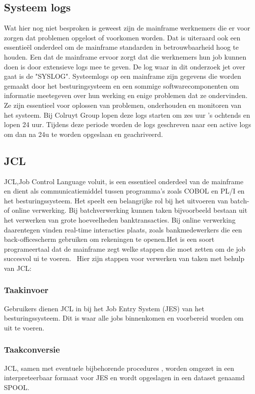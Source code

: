 \subsection{Systeem logs}
 Wat hier nog niet besproken is geweest zijn de mainframe werknemers die er voor zorgen dat problemen opgelost of voorkomen worden. Dat is uiteraard ook een essentieël onderdeel om de mainframe standarden in betrouwbaarheid hoog te houden. Een dat de mainframe ervoor zorgt dat die werknemers hun job kunnen doen is door extensieve logs mee te geven. De log waar in dit onderzoek jet over gaat is de "SYSLOG". Systeemlogs op een mainframe zijn gegevens die worden gemaakt door het besturingsysteem en een sommige softwarecomponenten om informatie meetegeven over hun werking en enige problemen dat ze ondervinden. Ze zijn essentieel voor oplossen van problemen, onderhouden en monitoren van het systeem. Bij Colruyt Group lopen deze logs starten om zes uur 's ochtends en lopen 24 uur. Tijdens deze periode worden de logs geschreven naar een active logs om dan na 24u te worden opgeslaan en geachriveerd.
 
\subsection{JCL}
JCL,Job Control Language voluit, is een essentieel onderdeel van de mainframe en dient als communicatiemiddel tussen programma's zoals COBOL en PL/I en het besturingssysteem. Het speelt een belangrijke rol bij het uitvoeren van batch- of online verwerking. Bij batchverwerking kunnen taken bijvoorbeeld bestaan uit het verwerken van grote hoeveelheden banktransacties. Bij online verwerking daarentegen vinden real-time interacties plaats, zoals bankmedewerkers die een back-officescherm gebruiken om rekeningen te openen.Het is een soort programeertaal dat de mainframe zegt welke stappen die moet zetten om de job succesvol ui te voeren.~\autocite{tutpoint} Hier zijn stappen voor verwerken van taken met behulp van JCL:

\subsubsection{Taakinvoer}
Gebruikers dienen JCL in bij het Job Entry System (JES) van het besturingssysteem. Dit is waar alle jobs binnenkomen en voorbereid worden om uit te voeren.

\subsubsection{Taakconversie}
JCL, samen met eventuele bijbehorende procedures , worden omgezet in een interpreteerbaar formaat voor JES en wordt opgeslagen in een dataset genaamd SPOOL.

